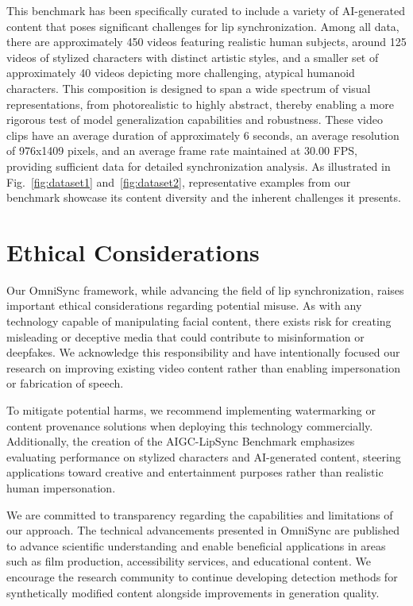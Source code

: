 This benchmark has been specifically curated to include a variety of AI-generated content that poses significant challenges for lip synchronization. Among all data, there are approximately 450 videos featuring realistic human subjects, around 125 videos of stylized characters with distinct artistic styles, and a smaller set of approximately 40 videos depicting more challenging, atypical humanoid characters. This composition is designed to span a wide spectrum of visual representations, from photorealistic to highly abstract, thereby enabling a more rigorous test of model generalization capabilities and robustness. These video clips have an average duration of approximately 6 seconds, an average resolution of 976x1409 pixels, and an average frame rate maintained at 30.00 FPS, providing sufficient data for detailed synchronization analysis. As illustrated in Fig.~\ref{fig:dataset1} and~\ref{fig:dataset2}, representative examples from our benchmark showcase its content diversity and the inherent challenges it presents.


\section{Ethical Considerations}
Our OmniSync framework, while advancing the field of lip synchronization, raises important ethical considerations regarding potential misuse. As with any technology capable of manipulating facial content, there exists risk for creating misleading or deceptive media that could contribute to misinformation or deepfakes. We acknowledge this responsibility and have intentionally focused our research on improving existing video content rather than enabling impersonation or fabrication of speech.

To mitigate potential harms, we recommend implementing watermarking or content provenance solutions when deploying this technology commercially. Additionally, the creation of the AIGC-LipSync Benchmark emphasizes evaluating performance on stylized characters and AI-generated content, steering applications toward creative and entertainment purposes rather than realistic human impersonation.

We are committed to transparency regarding the capabilities and limitations of our approach. The technical advancements presented in OmniSync are published to advance scientific understanding and enable beneficial applications in areas such as film production, accessibility services, and educational content. We encourage the research community to continue developing detection methods for synthetically modified content alongside improvements in generation quality.


